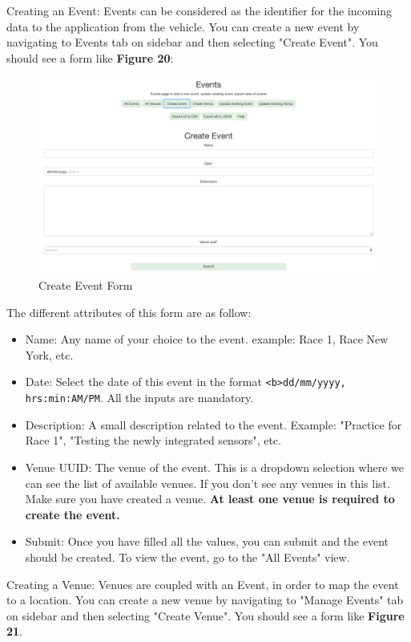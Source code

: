 \documentclass[12pt, letterpaper]{article}
\begin{document}
{{{{{{{{{\par Creating an Event: Events can be considered as the identifier for the incoming data to the application from the vehicle. You can create a new event by navigating to Events tab on sidebar and then selecting "Create Event".
You should see a form like \textbf{Figure 20}: \\
\begin{figure}[h!]
	\centering
	\includegraphics[width=1\columnwidth]{assets/create_event_form.png}
	\caption{Create Event Form}
	\end{figure}	
\par The different attributes of this form are as follow:
\begin{itemize}
	\item Name: Any name of your choice to the event. example: Race 1, Race New York, etc.
	\item Date: Select the date of this event in the format \texttt{<b>dd/mm/yyyy, hrs:min:AM/PM}. All the inputs are mandatory.
	\item Description: A small description related to the event. Example: "Practice for Race 1", "Testing the newly integrated sensors", etc.
	\item Venue UUID: The venue of the event. This is a dropdown selection where we can see the list of available venues. If you don't see any venues in this list. Make sure you have created a venue. \textbf{At least one venue is required to create the event.}
	\item Submit: Once you have filled all the values, you can submit and the event should be created. To view the event, go to the "All Events" view.
\end{itemize}

\par Creating a Venue: Venues are coupled with an Event, in order to map the event to a location. You can create a new venue by navigating to "Manage Events" tab on sidebar and then selecting "Create Venue". You should see a form like \textbf{Figure 21}. \\

}}}}}}}}}
\end{document}
